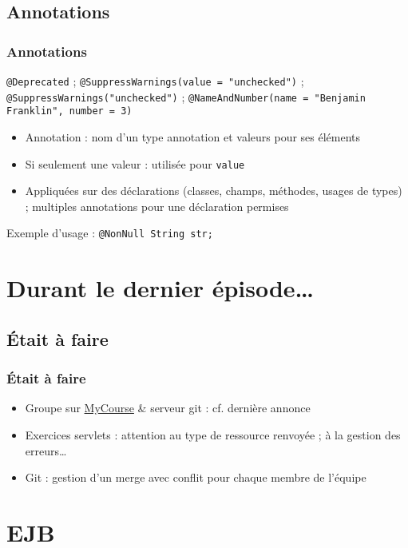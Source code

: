 \documentclass[english, french]{beamer}
\begin{document}
\subsection{Annotations}
\begin{frame}
	\frametitle{Annotations}
	\texttt{@Deprecated} ; \texttt{@SuppressWarnings(value = "unchecked")} ; \texttt{@SuppressWarnings("unchecked")} ; \texttt{@NameAndNumber(name = "Benjamin Franklin", number = 3)}
	\begin{itemize}
		\item Annotation : nom d’un type annotation et valeurs pour ses éléments
		\item Si seulement une valeur : utilisée pour \texttt{value}
		\item Appliquées sur des déclarations (classes, champs, méthodes, usages de types) ; multiples annotations pour une déclaration permises
	\end{itemize}
	Exemple d’usage : \texttt{@NonNull String str;}
\end{frame}

\section[Dernier épisode]{Durant le dernier épisode…}
\subsection{Était à faire}
\begin{frame}
	\frametitle{Était à faire}
	\begin{itemize}
		\item Groupe sur  \href{https://mycourse.dauphine.fr/webapps/blackboard/execute/courseMain?course_id=_34753_1}{MyCourse} \& serveur git : cf. dernière annonce
		\item Exercices servlets : attention au type de ressource renvoyée ; à la gestion des erreurs…
		\item Git : gestion d’un merge avec conflit pour chaque membre de l’équipe
	\end{itemize}
\end{frame}

\section{EJB}
\end{document}
